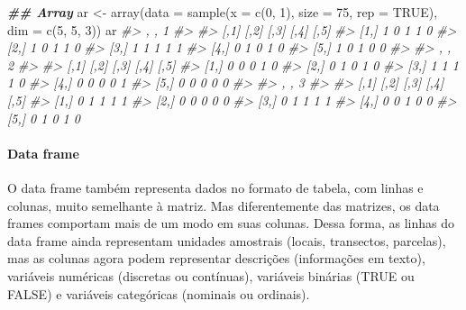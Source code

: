 \documentclass[
]{book}
\newenvironment{Shaded}{\begin{snugshade}}{\end{snugshade}}
\newcommand{\AttributeTok}[1]{\textcolor[rgb]{0.61,0.61,0.61}{#1}}
\newcommand{\CommentTok}[1]{\textcolor[rgb]{0.37,0.37,0.37}{\textit{#1}}}
\newcommand{\ConstantTok}[1]{\textcolor[rgb]{0,0,0}{#1}}
\newcommand{\DecValTok}[1]{\textcolor[rgb]{0.06,0.06,0.06}{#1}}
\newcommand{\DocumentationTok}[1]{\textcolor[rgb]{0.37,0.37,0.37}{\textbf{\textit{#1}}}}
\newcommand{\FunctionTok}[1]{\textcolor[rgb]{0,0,0}{#1}}
\newcommand{\NormalTok}[1]{#1}
\newcommand{\OtherTok}[1]{\textcolor[rgb]{0.37,0.37,0.37}{#1}}
\begin{document}
\begin{Shaded}
\begin{Highlighting}[]
\DocumentationTok{\#\# Array}
\NormalTok{ar }\OtherTok{\textless{}{-}} \FunctionTok{array}\NormalTok{(}\AttributeTok{data =} \FunctionTok{sample}\NormalTok{(}\AttributeTok{x =} \FunctionTok{c}\NormalTok{(}\DecValTok{0}\NormalTok{, }\DecValTok{1}\NormalTok{), }\AttributeTok{size =} \DecValTok{75}\NormalTok{, }\AttributeTok{rep =} \ConstantTok{TRUE}\NormalTok{), }
            \AttributeTok{dim =} \FunctionTok{c}\NormalTok{(}\DecValTok{5}\NormalTok{, }\DecValTok{5}\NormalTok{, }\DecValTok{3}\NormalTok{))}
\NormalTok{ar}
\CommentTok{\#\textgreater{} , , 1}
\CommentTok{\#\textgreater{} }
\CommentTok{\#\textgreater{}      [,1] [,2] [,3] [,4] [,5]}
\CommentTok{\#\textgreater{} [1,]    1    0    1    1    0}
\CommentTok{\#\textgreater{} [2,]    1    0    1    1    0}
\CommentTok{\#\textgreater{} [3,]    1    1    1    1    1}
\CommentTok{\#\textgreater{} [4,]    0    1    0    1    0}
\CommentTok{\#\textgreater{} [5,]    1    0    1    0    0}
\CommentTok{\#\textgreater{} }
\CommentTok{\#\textgreater{} , , 2}
\CommentTok{\#\textgreater{} }
\CommentTok{\#\textgreater{}      [,1] [,2] [,3] [,4] [,5]}
\CommentTok{\#\textgreater{} [1,]    0    0    0    1    0}
\CommentTok{\#\textgreater{} [2,]    0    1    0    1    0}
\CommentTok{\#\textgreater{} [3,]    1    1    1    1    0}
\CommentTok{\#\textgreater{} [4,]    0    0    0    0    1}
\CommentTok{\#\textgreater{} [5,]    0    0    0    0    0}
\CommentTok{\#\textgreater{} }
\CommentTok{\#\textgreater{} , , 3}
\CommentTok{\#\textgreater{} }
\CommentTok{\#\textgreater{}      [,1] [,2] [,3] [,4] [,5]}
\CommentTok{\#\textgreater{} [1,]    0    1    1    1    1}
\CommentTok{\#\textgreater{} [2,]    0    0    0    0    0}
\CommentTok{\#\textgreater{} [3,]    0    1    1    1    1}
\CommentTok{\#\textgreater{} [4,]    0    0    1    0    0}
\CommentTok{\#\textgreater{} [5,]    0    1    0    1    0}
\end{Highlighting}
\end{Shaded}

\hypertarget{data-frame}{%
\paragraph{Data frame}\label{data-frame}}

O data frame também representa dados no formato de tabela, com linhas e colunas, muito semelhante à matriz. Mas diferentemente das matrizes, os data frames comportam mais de um modo em suas colunas. Dessa forma, as linhas do data frame ainda representam unidades amostrais (locais, transectos, parcelas), mas as colunas agora podem representar descrições (informações em texto), variáveis numéricas (discretas ou contínuas), variáveis binárias (TRUE ou FALSE) e variáveis categóricas (nominais ou ordinais).
\end{document}
